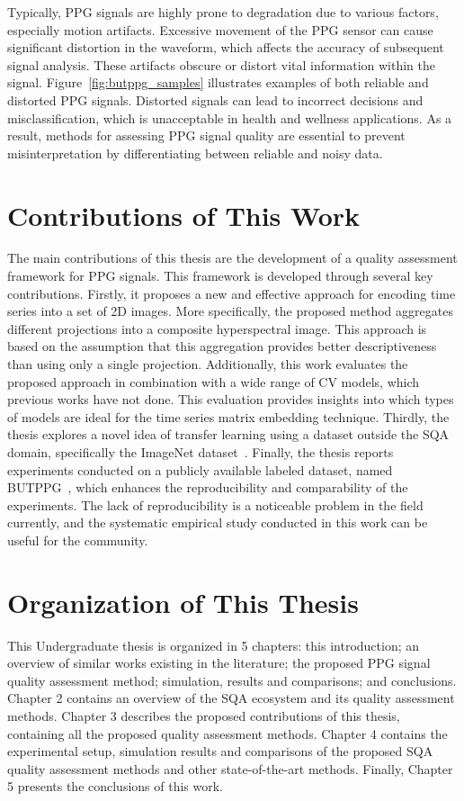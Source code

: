 Typically, \gls{PPG} signals are highly prone to degradation due to various factors, especially motion artifacts. Excessive movement of the \gls{PPG} sensor can cause significant distortion in the waveform, which affects the accuracy of subsequent signal analysis. These artifacts obscure or distort vital information within the signal. Figure~\ref{fig:butppg_samples} illustrates examples of both reliable and distorted \gls{PPG} signals. Distorted signals can lead to incorrect decisions and misclassification, which is unacceptable in health and wellness applications. As a result, methods for assessing \gls{PPG} signal quality are essential to prevent misinterpretation by differentiating between reliable and noisy data.

\section{Contributions of This Work}
\label{sec:my_work}

The main contributions of this thesis are the development of a quality assessment framework for \gls{PPG} signals. This framework is developed through several key contributions. Firstly, it proposes a new and effective approach for encoding time series into a set of 2D images. More specifically, the proposed method aggregates different projections into a composite hyperspectral image. This approach is based on the assumption that this aggregation provides better descriptiveness than using only a single projection. Additionally, this work evaluates the proposed approach in combination with a wide range of \gls{CV} models, which previous works have not done. This evaluation provides insights into which types of models are ideal for the time series matrix embedding technique. Thirdly, the thesis explores a novel idea of transfer learning using a dataset outside the \gls{SQA} domain, specifically the ImageNet dataset~\cite{ImageNet}. Finally, the thesis reports experiments conducted on a publicly available labeled dataset, named \gls{BUTPPG}~\cite{butppg}, which enhances the reproducibility and comparability of the experiments. The lack of reproducibility is a noticeable problem in the field currently, and the systematic empirical study conducted in this work can be useful for the community.

\section{Organization of This Thesis}
\label{sec:organization}

This Undergraduate thesis is organized in 5 chapters: this introduction; an overview of similar works existing in the literature; the proposed \gls{PPG} signal quality assessment method; simulation, results and comparisons; and conclusions. Chapter 2 contains an overview of the \gls{SQA} ecosystem and its quality assessment methods. Chapter 3 describes the proposed contributions of this thesis, containing all the proposed quality assessment methods. Chapter 4 contains the experimental setup, simulation results and comparisons of the proposed \gls{SQA} quality assessment methods and other state-of-the-art methods. Finally, Chapter 5 presents the conclusions of this work. 


